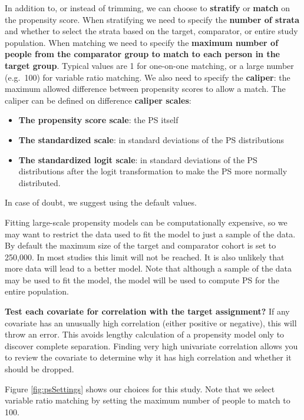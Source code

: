 \documentclass[]{book}
\providecommand{\tightlist}{%
  \setlength{\itemsep}{0pt}\setlength{\parskip}{0pt}}
\begin{document}
In addition to, or instead of trimming, we can choose to
\textbf{stratify} or \textbf{match} on the propensity score. When
stratifying we need to specify the \textbf{number of strata} and whether
to select the strata based on the target, comparator, or entire study
population. When matching we need to specify the \textbf{maximum number
of people from the comparator group to match to each person in the
target group}. Typical values are 1 for one-on-one matching, or a large
number (e.g.~100) for variable ratio matching. We also need to specify
the \textbf{caliper}: the maximum allowed difference between propensity
scores to allow a match. The caliper can be defined on difference
\textbf{caliper scales}:

\begin{itemize}
\tightlist
\item
  \textbf{The propensity score scale}: the PS itself
\item
  \textbf{The standardized scale}: in standard deviations of the PS
  distributions
\item
  \textbf{The standardized logit scale}: in standard deviations of the
  PS distributions after the logit transformation to make the PS more
  normally distributed.
\end{itemize}

In case of doubt, we suggest using the default values.

Fitting large-scale propensity models can be computationally expensive,
so we may want to restrict the data used to fit the model to just a
sample of the data. By default the maximum size of the target and
comparator cohort is set to 250,000. In most studies this limit will not
be reached. It is also unlikely that more data will lead to a better
model. Note that although a sample of the data may be used to fit the
model, the model will be used to compute PS for the entire population.

\textbf{Test each covariate for correlation with the target assignment?}
If any covariate has an unusually high correlation (either positive or
negative), this will throw an error. This avoids lengthy calculation of
a propensity model only to discover complete separation. Finding very
high univariate correlation allows you to review the covariate to
determine why it has high correlation and whether it should be dropped.

Figure \ref{fig:psSettings} shows our choices for this study. Note that
we select variable ratio matching by setting the maximum number of
people to match to 100.
\end{document}
